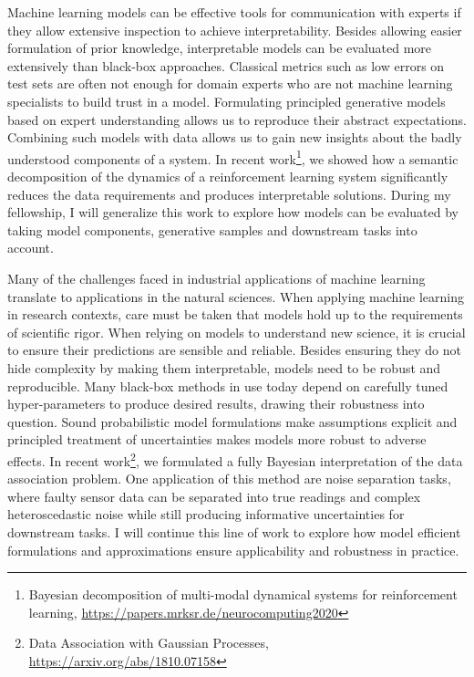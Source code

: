 Machine learning models can be effective tools for communication with experts if they allow extensive inspection to achieve interpretability.
Besides allowing easier formulation of prior knowledge, interpretable models can be evaluated more extensively than black-box approaches.
Classical metrics such as low errors on test sets are often not enough for domain experts who are not machine learning specialists to build trust in a model.
Formulating principled generative models based on expert understanding allows us to reproduce their abstract expectations.
Combining such models with data allows us to gain new insights about the badly understood components of a system.
In recent work\footnote{Bayesian decomposition of multi-modal dynamical systems for reinforcement learning, \url{https://papers.mrksr.de/neurocomputing2020}}, we showed how a semantic decomposition of the dynamics of a reinforcement learning system significantly reduces the data requirements and produces interpretable solutions.
During my fellowship, I will generalize this work to explore how models can be evaluated by taking model components, generative samples and downstream tasks into account.

Many of the challenges faced in industrial applications of machine learning translate to applications in the natural sciences.
When applying machine learning in research contexts, care must be taken that models hold up to the requirements of scientific rigor.
When relying on models to understand new science, it is crucial to ensure their predictions are sensible and reliable.
Besides ensuring they do not hide complexity by making them interpretable, models need to be robust and reproducible.
Many black-box methods in use today depend on carefully tuned hyper-parameters to produce desired results, drawing their robustness into question.
Sound probabilistic model formulations make assumptions explicit and principled treatment of uncertainties makes models more robust to adverse effects.
In recent work\footnote{Data Association with Gaussian Processes, \url{https://arxiv.org/abs/1810.07158}}, we formulated a fully Bayesian interpretation of the data association problem.
One application of this method are noise separation tasks, where faulty sensor data can be separated into true readings and complex heteroscedastic noise while still producing informative uncertainties for downstream tasks.
I will continue this line of work to explore how model efficient formulations and approximations ensure applicability and robustness in practice.

